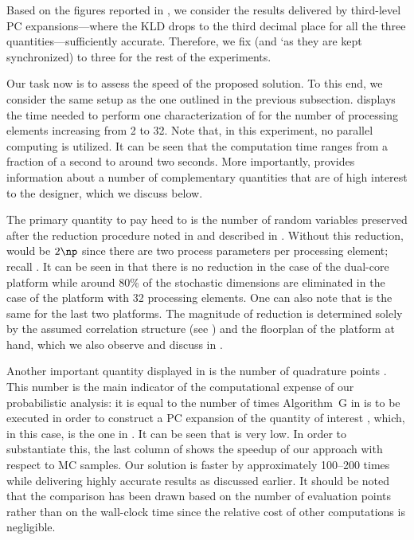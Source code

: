 Based on the figures reported in , we consider
the results delivered by third-level \ac{PC} expansions---where the \ac{KLD}
drops to the third decimal place for all the three quantities---sufficiently
accurate. Therefore, we fix \lc (and \lq as they are kept synchronized) to three
for the rest of the experiments.


Our task now is to assess the speed of the proposed solution. To this end, we
consider the same setup as the one outlined in the previous subsection.
 displays the time needed to perform one
characterization of \vg for the number of processing elements \np increasing
from 2 to 32. Note that, in this experiment, no parallel computing is utilized.
It can be seen that the computation time ranges from a fraction of a second to
around two seconds. More importantly,  provides
information about a number of complementary quantities that are of high interest
to the designer, which we discuss below.

The primary quantity to pay heed to is the number of random variables \nz
preserved after the reduction procedure noted in  and
described in . Without this reduction, \nz
would be $2 \np$ since there are two process parameters per processing element;
recall . It can be seen in
 that there is no reduction in the case of the
dual-core platform while around 80\% of the stochastic dimensions are eliminated
in the case of the platform with 32 processing elements. One can also note that
\nz is the same for the last two platforms. The magnitude of reduction is
determined solely by the assumed correlation structure (see
) and the floorplan of the platform at
hand, which we also observe and discuss in .

Another important quantity displayed in  is the
number of quadrature points \nq. This number is the main indicator of the
computational expense of our probabilistic analysis: it is equal to the number
of times Algorithm~G in  is to be executed in order to
construct a \ac{PC} expansion of the quantity of interest \g, which, in this
case, is the one in . It can be seen that \nq
is very low. In order to substantiate this, the last column of
 shows the speedup of our approach with respect
to  \ac{MC} samples. Our solution is faster by approximately
100--200 times while delivering highly accurate results as discussed earlier. It
should be noted that the comparison has been drawn based on the number of
evaluation points rather than on the wall-clock time since the relative cost of
other computations is negligible.

